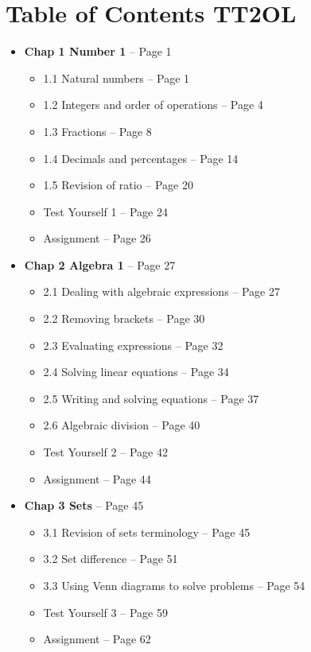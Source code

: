 \documentclass{article}
\begin{document}
\section*{Table of Contents TT2OL}

\begin{itemize}
    \item \textbf{Chap 1 Number 1} -- Page 1
    \begin{itemize}
        \item 1.1 Natural numbers -- Page 1
        \item 1.2 Integers and order of operations -- Page 4
        \item 1.3 Fractions -- Page 8
        \item 1.4 Decimals and percentages -- Page 14
        \item 1.5 Revision of ratio -- Page 20
        \item Test Yourself 1 -- Page 24
        \item Assignment -- Page 26
    \end{itemize}
    
    \item \textbf{Chap 2 Algebra 1} -- Page 27
    \begin{itemize}
        \item 2.1 Dealing with algebraic expressions -- Page 27
        \item 2.2 Removing brackets -- Page 30
        \item 2.3 Evaluating expressions -- Page 32
        \item 2.4 Solving linear equations -- Page 34
        \item 2.5 Writing and solving equations -- Page 37
        \item 2.6 Algebraic division -- Page 40
        \item Test Yourself 2 -- Page 42
        \item Assignment -- Page 44
    \end{itemize}

    \item \textbf{Chap 3 Sets} -- Page 45
    \begin{itemize}
        \item 3.1 Revision of sets terminology -- Page 45
        \item 3.2 Set difference -- Page 51
        \item 3.3 Using Venn diagrams to solve problems -- Page 54
        \item Test Yourself 3 -- Page 59
        \item Assignment -- Page 62
    \end{itemize}


\end{itemize}
\end{document}
